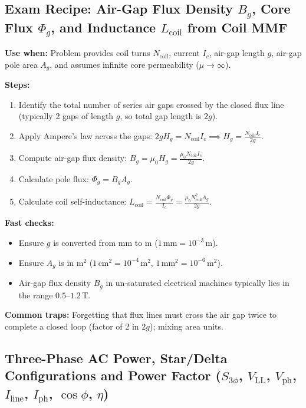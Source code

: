 \subsection{Exam Recipe: Air-Gap Flux Density $B_g$, Core Flux $\Phi_g$, and Inductance $L_{\mathrm{coil}}$ from Coil MMF}
\textbf{Use when:} Problem provides coil turns $N_{\mathrm{coil}}$, current $I_c$, air-gap length $g$, air-gap pole area $A_g$, and assumes infinite core permeability ($\mu\to\infty$).

\textbf{Steps:}
\begin{enumerate}
  \item Identify the total number of series air gaps crossed by the closed flux line (typically 2 gaps of length $g$, so total gap length is $2g$).
  \item Apply Ampere's law across the gaps: $2g H_g = N_{\mathrm{coil}} I_c \implies H_g = \frac{N_{\mathrm{coil}} I_c}{2g}$.
  \item Compute air-gap flux density: $B_g = \mu_0 H_g = \frac{\mu_0 N_{\mathrm{coil}} I_c}{2g}$.
  \item Calculate pole flux: $\Phi_g = B_g A_g$.
  \item Calculate coil self-inductance: $L_{\mathrm{coil}} = \frac{N_{\mathrm{coil}}\Phi_g}{I_c} = \frac{\mu_0 N_{\mathrm{coil}}^2 A_g}{2g}$.
\end{enumerate}

\textbf{Fast checks:}
\begin{itemize}
  \item Ensure $g$ is converted from $\mathrm{mm}$ to $\mathrm{m}$ ($1\,\mathrm{mm} = 10^{-3}\,\mathrm{m}$).
  \item Ensure $A_g$ is in $\mathrm{m^2}$ ($1\,\mathrm{cm^2} = 10^{-4}\,\mathrm{m^2}$, $1\,\mathrm{mm^2} = 10^{-6}\,\mathrm{m^2}$).
  \item Air-gap flux density $B_g$ in un-saturated electrical machines typically lies in the range $0.5\text{--}1.2\,\mathrm{T}$.
\end{itemize}

\textbf{Common traps:} Forgetting that flux lines must cross the air gap twice to complete a closed loop (factor of 2 in $2g$); mixing area units.

\subsection{Three-Phase AC Power, Star/Delta Configurations and Power Factor ($S_{3\phi}$, $V_{\mathrm{LL}}$, $V_{\mathrm{ph}}$, $I_{\mathrm{line}}$, $I_{\mathrm{ph}}$, $\cos\phi$, $\eta$)}

